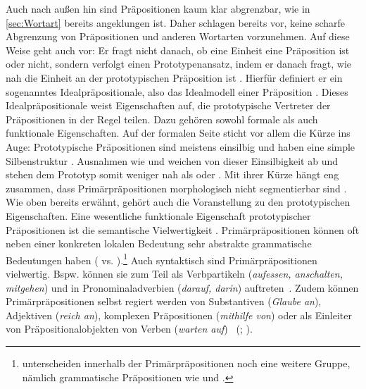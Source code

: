 Auch nach außen hin sind Präpositionen kaum klar abgrenzbar, wie in \autoref{sec:Wortart} bereits angeklungen ist. 
Daher schlagen bereits \citet{Quirk.1964} vor, keine scharfe Abgrenzung von Pr{\"a}positionen und anderen Wortarten vorzunehmen. 
Auf diese Weise geht auch \citet[]{Lindqvist1994} vor: Er fragt nicht danach, ob eine Einheit eine Präposition ist oder nicht, sondern verfolgt einen Prototypenansatz, indem er danach fragt, wie nah die Einheit an der prototypischen Präposition ist \citep[s.][13]{Lindqvist1994}. 
Hierfür definiert er ein sogenanntes Idealpräpositionale, also das Ideal\-modell einer Pr{\"a}position \citep[s.][15--16]{Lindqvist1994}. 
Dieses Idealpräpositionale weist Eigenschaften auf, die prototypische Vertreter der Präpositionen in der Regel teilen. 
Dazu geh{\"o}ren sowohl formale als auch funktionale Eigenschaften. 
Auf der formalen Seite sticht vor allem die Kürze ins Auge: Prototypische Präpositionen sind meistens einsilbig und haben eine simple Silbenstruktur \citep[s.][§899]{Duden2016}. 
Ausnahmen wie  und  weichen von dieser Einsilbigkeit ab und stehen dem Prototyp somit weniger nah als  oder .
Mit ihrer Kürze hängt eng zusammen, dass Primärpräpositionen morphologisch nicht segmentierbar sind \citep[s.][33]{Lehmann1992}. 
Wie oben bereits erwähnt, gehört auch die Voranstellung zu den prototypischen Eigenschaften.  
Eine wesentliche funktionale Eigenschaft prototypischer Präpositionen ist die semantische Vielwertigkeit \citep[s.][15]{Lindqvist1994}. 
Primärpräpositionen können oft neben einer konkreten lokalen Bedeutung sehr abstrakte grammatische Bedeutungen haben ( vs. ).\footnote{\citet[10--11]{Lehmann1992} unterscheiden innerhalb der Primärpräpositionen noch eine weitere Gruppe, nämlich grammatische Präpositionen wie  und .}
Auch syntaktisch sind Primärpräpositionen vielwertig.
Bspw. können sie zum Teil als Verbpartikeln (\textit{aufessen, anschalten, mitgehen}) und in Pronominaladverbien (\textit{darauf, darin}) auftreten~\citep[s.][275--276]{Lindqvist1994}.  
Zudem können Prim{\"a}rpr{\"a}positionen selbst regiert werden von Substantiven (\textit{Glaube an}), Adjektiven (\textit{reich an}), komplexen Pr{\"a}positionen (\textit{mithilfe von}) oder als Einleiter von Präpositionalobjekten von Verben (\textit{warten auf}) ~(\citealp[s.][39]{Lehmann1992};  \citealp[68]{Diewald.1997}).

